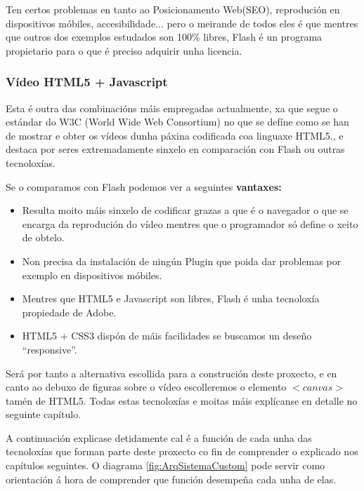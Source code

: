             Ten certos problemas en tanto ao Posicionamento Web(SEO), reprodución en 
            dispositivos móbiles, accesibilidade... pero o meirande de todos eles é que mentres
            que outros dos exemplos estudados son 100\% libres, Flash é un programa propietario
            para o que é preciso adquirir unha licencia.        
            
        
        \subsubsection{Vídeo HTML5 + Javascript}
            Esta é outra das combinacións máis empregadas actualmente, xa que segue o estándar
            do W3C (World Wide Web Consortium)\cite{w3schools-video-tag} no que se defíne como se
            han de mostrar e obter os vídeos dunha páxina codificada coa linguaxe HTML5., e 
            destaca por seres extremadamente sinxelo en comparación con Flash ou outras tecnoloxías.
            
            Se o comparamos con Flash podemos ver a seguintes \textbf{vantaxes:}
            \begin{itemize}
                \item Resulta moito máis sinxelo de codificar grazas a que é o navegador o que se 
                encarga da reprodución do vídeo mentres que o programador só define o xeito de obtelo.
                \item Non precisa da instalación de ningún Plugin que poida dar problemas por exemplo 
                en dispositivos móbiles.
                \item Mentres que HTML5 e Javascript son libres, Flash é unha tecnoloxía propiedade de 
                Adobe.
                \item HTML5 + CSS3 dispón de máis facilidades se buscamos un deseño ``responsive''.
            \end{itemize}

            Será por tanto a alternativa escollida para a construción deste proxecto, e en canto ao 
            debuxo de figuras sobre o vídeo escolleremos o elemento $<canvas>$ tamén de HTML5. Todas
            estas tecnoloxías e moitas máis explícanse en detalle no seguinte capítulo.
            
    
    
    
    A continuación explicase detidamente cal é a función de cada unha das tecnoloxías que forman 
    parte deste proxecto co fin de comprender o explicado nos capítulos seguintes. O diagrama 
    \ref{fig:ArqSistemaCustom} pode servir como orientación á hora de comprender que función 
    desempeña cada unha de elas.
    
